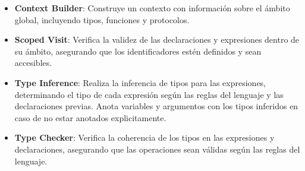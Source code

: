 \documentclass{article}
\begin{document}
\begin{itemize}
  \item \textbf{Context Builder}: Construye un contexto con información sobre el ámbito global, incluyendo tipos, funciones y protocolos.
  \item \textbf{Scoped Visit}: Verifica la validez de las declaraciones y expresiones dentro de su ámbito, asegurando que los identificadores estén definidos y sean accesibles.
  \item \textbf{Type Inference}: Realiza la inferencia de tipos para las expresiones, determinando el tipo de cada expresión según las reglas del lenguaje y las declaraciones previas. Anota variables y argumentos con los tipos inferidos en caso de no estar anotados explicitamente.
  \item \textbf{Type Checker}: Verifica la coherencia de los tipos en las expresiones y declaraciones, asegurando que las operaciones sean válidas según las reglas del lenguaje.
\end{itemize}
\end{document}
